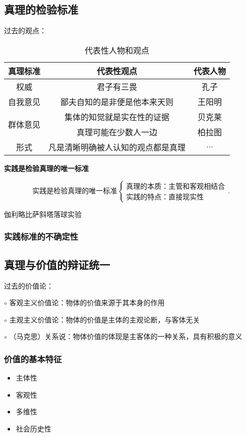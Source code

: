 \subsection{真理的检验标准}%
\label{sub:真理的检验标准}
过去的观点：
\begin{table}[htpb]
    \centering
    \caption{代表性人物和观点}
    \label{tab:代表性人物和观点}
    \begin{tabular}{ccc}
    \toprule
    真理标准 & 代表性观点 & 代表人物\\
    \midrule
    权威 & 君子有三畏 & 孔子\\
    自我意见 & 鄙夫自知的是非便是他本来天则 & 王阳明\\
    \multirow{2}{*}{群体意见} & 集体的知觉就是实在性的证据 & 贝克莱\\
                              & 真理可能在少数人一边 & 柏拉图\\
    形式 & 凡是清晰明确被人认知的观点都是真理 & $\ldots $ \\
    \bottomrule
    \end{tabular}
\end{table}
\begin{notation}
    \textbf{实践是检验真理的唯一标准}
\end{notation}
\[
    \text{实践是检验真理的唯一标准}
    \begin{cases}
        \text{真理的本质：主管和客观相结合}\\
        \text{实践的特点：直接现实性}
    \end{cases}
.\] 
\begin{eg}
    伽利略比萨斜塔落球实验
\end{eg}
\subsubsection*{实践标准的不确定性}%
\label{subsub:实践标准的不确定性}
\subsection{真理与价值的辩证统一}%
\label{sub:真理与价值的辩证统一}
过去的价值论：

$\circ$ 客观主义价值论：物体的价值来源于其本身的作用

$\circ$ 主观主义价值论：物体的价值是主体的主观论断，与客体无关
\begin{notation}
    $\circ$ （马克思）关系说：物体价值的体现是主客体的一种关系，具有积极的意义
\end{notation}
\subsubsection*{价值的基本特征}%
\label{subsub:价值的基本特征}
\begin{itemize}
    \item 主体性
    \item 客观性
    \item 多维性
    \item 社会历史性
\end{itemize}
